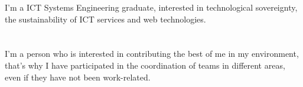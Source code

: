 \documentclass[9pt]{developercv} %
\begin{document}
\vspace{0.5cm}



\begin{minipage}[t]{0.4\textwidth} %
	\vspace{-\baselineskip} %
	I'm a ICT Systems Engineering graduate, interested in technological sovereignty, the sustainability of ICT services and web technologies.\\
    \\
    \\
	I'm a person who is interested in contributing the best of me in my environment, that's why I have participated in the coordination of teams in different areas, even if they have not been work-related.
\end{minipage}
\hfill %
\begin{minipage}[t]{0.5\textwidth} %
	\vspace{-\baselineskip} %
	\begin{barchart}{5.5}
	\end{barchart}
\end{minipage}


\end{document}
